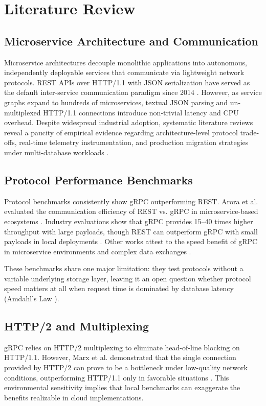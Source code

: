 \documentclass[conference]{IEEEtran}
\begin{document}
\section{Literature Review}

\subsection{Microservice Architecture and Communication}
Microservice architectures decouple monolithic applications into autonomous, independently deployable services that communicate via lightweight network protocols. REST APIs over HTTP/1.1 with JSON serialization have served as the default inter-service communication paradigm since 2014 \cite{vural2017}. However, as service graphs expand to hundreds of microservices, textual JSON parsing and un-multiplexed HTTP/1.1 connections introduce non-trivial latency and CPU overhead. Despite widespread industrial adoption, systematic literature reviews reveal a paucity of empirical evidence regarding architecture-level protocol trade-offs, real-time telemetry instrumentation, and production migration strategies under multi-database workloads \cite{li2021, waseem2020, cerny2021}.

\subsection{Protocol Performance Benchmarks}
Protocol benchmarks consistently show gRPC outperforming REST. Arora et al. evaluated the communication efficiency of REST vs. gRPC in microservice-based ecosystems \cite{arora2024}. Industry evaluations show that gRPC provides 15--40 times higher throughput with large payloads, though REST can outperform gRPC with small payloads in local deployments \cite{apriansyah2024}. Other works attest to the speed benefit of gRPC in microservice environments \cite{weerasinghe2022} and complex data exchanges \cite{bolanowski2022, apriansyah2024}.

These benchmarks share one major limitation: they test protocols without a variable underlying storage layer, leaving it an open question whether protocol speed matters at all when request time is dominated by database latency (Amdahl's Law \cite{amdahl1967}).

\subsection{HTTP/2 and Multiplexing}
gRPC relies on HTTP/2 multiplexing to eliminate head-of-line blocking on HTTP/1.1. However, Marx et al. demonstrated that the single connection provided by HTTP/2 can prove to be a bottleneck under low-quality network conditions, outperforming HTTP/1.1 only in favorable situations \cite{marx2018}. This environmental sensitivity implies that local benchmarks can exaggerate the benefits realizable in cloud implementations.
\end{document}
